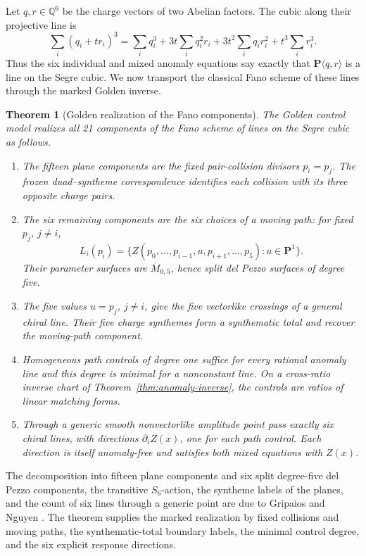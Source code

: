 \documentclass[11pt]{article}
\newtheorem{theorem}{Theorem}[section]
\theoremstyle{definition}
\theoremstyle{remark}
\begin{document}
Let \(q,r\in\mathbb Q^6\) be the charge vectors of two Abelian factors.
The cubic along their projective line is
\[
 \sum_i(q_i+tr_i)^3
 =\sum_iq_i^3+3t\sum_iq_i^2r_i
  +3t^2\sum_iq_ir_i^2+t^3\sum_ir_i^3.
\]
Thus the six individual and mixed anomaly equations say exactly that
\(\mathbf P\langle q,r\rangle\) is a line on the Segre cubic.  We now
transport the classical Fano scheme of these lines through the marked
Golden inverse.

\begin{theorem}[Golden realization of the Fano components]
\label{thm:two-u1-lines}
The Golden control model realizes all 21 components of the Fano scheme of
lines on the Segre cubic as follows.
\begin{enumerate}[label=\textup{(\roman*)},leftmargin=*]
\item The fifteen plane components are the fixed pair-collision divisors
  \(p_i=p_j\).  The frozen duad--syntheme correspondence identifies each
  collision with its three opposite charge pairs.
\item The six remaining components are the six choices of a moving path:
  for fixed \(p_j\), \(j\ne i\),
  \[
    L_i(p_{\widehat\imath})
    =\{Z(p_0,\ldots,p_{i-1},u,p_{i+1},\ldots,p_5):u\in\mathbf P^1\}.
  \]
  Their parameter surfaces are
  \(\overline M_{0,5}\), hence split del Pezzo surfaces of degree five.
\item The five values \(u=p_j\), \(j\ne i\), give the five vectorlike
  crossings of a general chiral line.  Their five charge synthemes form a
  synthematic total and recover the moving-path component.
\item Homogeneous path controls of degree one suffice for every rational
  anomaly line and this degree is minimal for a nonconstant line.  On a
  cross-ratio inverse chart of Theorem~\ref{thm:anomaly-inverse}, the
  controls are ratios of linear matching forms.
\item Through a generic smooth nonvectorlike amplitude point pass exactly
  six chiral lines, with directions \(\partial_iZ(x)\), one for each path
  control.  Each direction is itself anomaly-free and satisfies both mixed
  equations with \(Z(x)\).
\end{enumerate}
\end{theorem}

The decomposition into fifteen plane components and six split
degree-five del Pezzo components, the transitive \(S_6\)-action, the
syntheme labels of the planes, and the count of six lines through a
generic point are due to Gripaios and Nguyen
\cite[Sections~1 and~4]{GripaiosNguyenTwo}.  The theorem supplies the
marked realization by fixed collisions and moving paths, the
synthematic-total boundary labels, the minimal control degree, and the six
explicit response directions.
\end{document}
